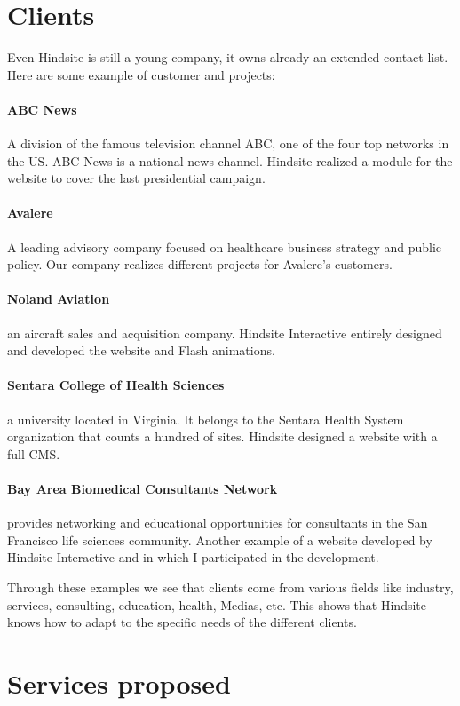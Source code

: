 \section{Clients}

Even Hindsite is still a young company, it owns already an extended contact
list. Here are some example of customer and projects:

\paragraph*{ABC News}
A division of the famous television channel ABC, one of the
four top networks in the US. ABC News is a national news channel. Hindsite
realized a module for the website to cover the last presidential campaign.
\paragraph*{Avalere}
A leading advisory company focused on healthcare business
strategy and public policy. Our company realizes different projects for
Avalere’s customers.
\paragraph*{Noland Aviation} an aircraft sales and acquisition company. Hindsite
Interactive entirely designed and developed the website and Flash animations.
\paragraph*{Sentara College of Health Sciences} a university located in Virginia. It
belongs to the Sentara Health System organization that counts a hundred of
sites. Hindsite designed a website with a full CMS.
\paragraph*{Bay Area Biomedical Consultants Network} provides
networking and educational opportunities for consultants in the San Francisco
life sciences community. Another example of a website developed by Hindsite
Interactive and in which I participated in the development.

Through these examples we see that clients come from various fields like
industry, services, consulting, education, health, Medias, etc.
This shows that Hindsite knows how to adapt to the specific needs of the
different clients.

\section{Services proposed}

